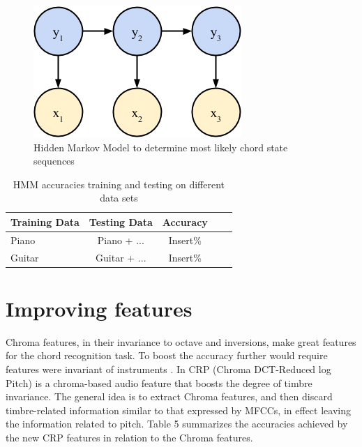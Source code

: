\documentclass{article}
\begin{document}
\begin{figure}[ht]
\vskip 0.2in
\begin{center}
\centerline{\includegraphics[width=\columnwidth]{hmm}}
\caption{Hidden Markov Model to determine most likely chord state sequences}
\label{icml-historical}
\end{center}
\vskip -0.2in
\end{figure}

\begin{table}[t]
\caption{HMM accuracies training and testing on different data sets}
\label{hmmacc}
\vskip 0.15in
\begin{center}
\begin{small}
\begin{sc}
\begin{tabular}{lcccr}
\hline
\abovespace\belowspace
Training Data & Testing Data & Accuracy \\
\hline
\abovespace
Piano & Piano + ... & Insert\%\\
Guitar & Guitar + ... & Insert\%\\
\hline
\end{tabular}
\end{sc}
\end{small}
\end{center}
\vskip -0.1in
\end{table}

\section{Improving features}

Chroma features, in their invariance to octave and inversions, make great
features for the chord recognition task. To boost the accuracy further would
require features were invariant of instruments \cite{jiang}. In CRP (Chroma
DCT-Reduced log Pitch) is a chroma-based audio feature that boosts the degree of
timbre invariance. The general idea is to extract Chroma features, and then
discard timbre-related information similar to that expressed by MFCCs, in effect
leaving the information related to pitch. Table 5 summarizes the accuracies
achieved by the new CRP features in relation to the Chroma features.
\end{document}
